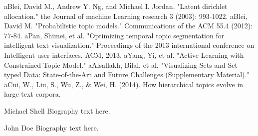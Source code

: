 \documentclass[10pt,journal,compsoc]{IEEEtran}
\begin{document}

%
%
%

\begin{thebibliography}{1}
\bibitem aBlei, David M., Andrew Y. Ng, and Michael I. Jordan. "Latent dirichlet allocation." the Journal of machine Learning research 3 (2003): 993-1022.
\bibitem aBlei, David M. "Probabilistic topic models." Communications of the ACM 55.4 (2012): 77-84.
\bibitem aPan, Shimei, et al. "Optimizing temporal topic segmentation for intelligent text visualization." Proceedings of the 2013 international conference on Intelligent user interfaces. ACM, 2013.
\bibitem aYang, Yi, et al. "Active Learning with Constrained Topic Model."
\bibitem aAlsallakh, Bilal, et al. "Visualizing Sets and Set-typed Data: State-of-the-Art and Future Challenges (Supplementary Material)."
\bibitem aCui, W., Liu, S., Wu, Z., \& Wei, H. (2014). How hierarchical topics evolve in large text corpora.
\end{thebibliography}

% 

\begin{IEEEbiography}{Michael Shell}
Biography text here.
\end{IEEEbiography}

\begin{IEEEbiographynophoto}{John Doe}
Biography text here.
\end{IEEEbiographynophoto}
\end{document}
